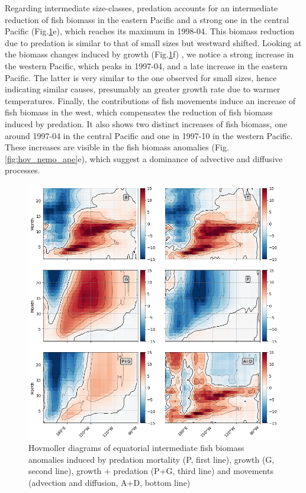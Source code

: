 Regarding intermediate size-classes, predation accounts for an intermediate reduction of fish biomass in the eastern Pacific and a strong one in the central Pacific (Fig.\ref{fig:hov_ape_trends_20}e), which reaches its maximum in 1998-04. This biomass reduction due to predation is similar to that of small sizes but westward shifted. Looking at the biomass  changes induced by growth (Fig.\ref{fig:hov_ape_trends_20}f) , we notice a strong increase in the western Pacific, which peaks in 1997-04, and a late increase  in the eastern Pacific. The latter is very similar to the one observed for small sizes, hence indicating similar causes, presumably an greater growth rate due to warmer temperatures. Finally, the contributions of fish movements induce an increase of fish biomass in the west, which compensates the reduction of fish biomass induced by predation. It also shows two distinct increases of fish biomass, one around 1997-04 in the central Pacific and one in 1997-10 in the western Pacific. These increases are visible in the fish biomass anomalies (Fig.\ref{fig:hov_nemo_ape}e), which suggest a dominance of advective and diffusive processes.

\begin{figure}[htp]
	\centering
	\includegraphics[scale=0.4]{figs/hov_compo_l_20.png}	
	\caption{Hovmoller diagrams of equatorial intermediate fish biomass anomalies induced by predation mortality (P, first line), growth (G, second line), growth + predation (P+G, third line) and movements (advection and diffusion, A+D, bottom line)}	
	\label{fig:hov_ape_trends_20}
\end{figure}

